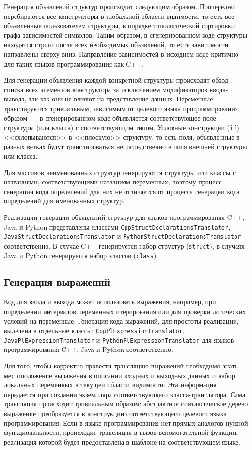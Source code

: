 \documentclass[times,specification,annotation]{style/itmo-student-thesis/itmo-student-thesis}
\begin{document}
Генерация объявлений структур происходит следующим образом. Поочередно перебираются все конструкторы в глобальной области видимости, то есть все объявленные пользователем структуры, в порядке топологической сортировки графа зависимостей символов. Таким образом, в сгенерированном коде структуры находятся строго после всех необходимых объявлений, то есть зависимости направлены сверху вниз. Направление зависимостей в исходном коде критично для таких языков программирования как C++.

Для генерации объявления каждой конкретной структуры происходит обход списка всех элементов конструктора за исключением модификаторов ввода-вывода, так как они не влияют на представление данных. Переменные транслируются тривиальным, зависимым от целевого языка программирования, образом~--- в сгенерированном коде объявляется соответствующее поле структуры (или класса) с соответствующим типом. Условные конструкции (\texttt{if}) <<схлопываются>> в <<плоскую>> структуру, то есть поля, объявленные в разных ветках будут транслироваться непосредственно в поля внешней структуры или класса.

Для массивов неименованных структур генерируются структуры или классы с названиями, соответствующими названиям переменных, поэтому процесс генерации кода определений для них не отличается от процесса генерации кода определений для именованных структур.

Реализации генерации объявлений структур для языков программирования C++, Java и Python представлены классами \texttt{CppStructDeclarationsTranslator}, \texttt{JavaStructDeclarationsTranslator} и \texttt{PythonStructDeclarationsTranslator} соответственно. В случае C++ генерируется набор структур (\texttt{struct}), в случаях Java и Python генерируется набор классов (\texttt{class}).

\subsection{Генерация выражений}

Код для ввода и вывода может использовать выражения, например, при определении интервалов переменных итерирования или для проверки логических условий на переменные. Генерация кода выражений, для простоты реализации, выделена в отдельные классы: \texttt{CppPlExpressionTranslator}, \texttt{JavaPlExpressionTranslator} и \texttt{PythonPlExpressionTranslator} для языков программирования C++, Java и Python соответственно.

Для того, чтобы корректно провести трансляцию выражений необходимо знать местоположение выражения в описании входных и выходных данных и набор локальных переменных в текущей области видимости. Эта информация передается при создании экземпляра соответствующего класса-транслятора. Сама трансляция происходит тривиальным образом: абстрактное синтаксическое дерево выражение преобразуется в конструкции соответствующего целевого языка программирования. Если в языке программирования нет прямых аналогов нужной функциональности, происходит трансляция в вызов вспомогательной функции, реализация которой будет предоставлена в шаблоне на соответствующем языке.
\end{document}
